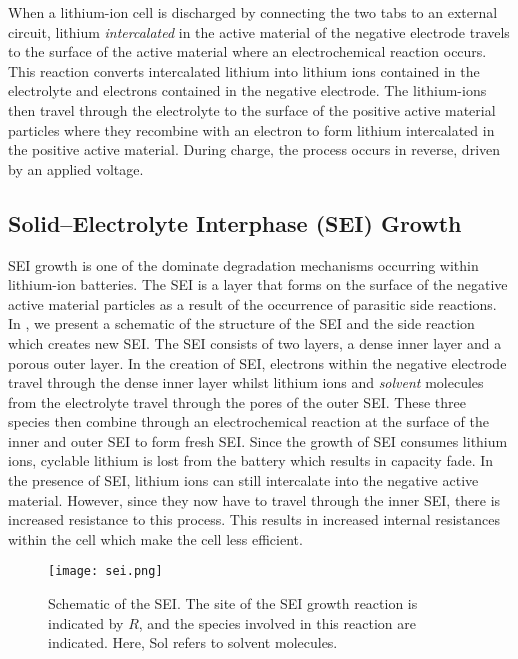 \documentclass[english,a4paper,oneside,9pt]{extarticle}
\begin{document}
When a lithium-ion cell is discharged by connecting the two tabs to an external circuit, lithium \emph{intercalated} in the active material of the negative electrode travels to the surface of the active material where an electrochemical reaction occurs. This reaction converts intercalated lithium into lithium ions contained in the electrolyte and electrons contained in the negative electrode. The lithium-ions then travel through the electrolyte to the surface of the positive active material particles where they recombine with an electron to form lithium intercalated in the positive active material. During charge, the process occurs in reverse, driven by an applied voltage.

\subsection{Solid--Electrolyte Interphase (SEI) Growth}
SEI growth is one of the dominate degradation mechanisms occurring within lithium-ion batteries. The SEI is a layer that forms on the surface of the negative active material particles as a result of the occurrence of parasitic side reactions. In , we present a schematic of the structure of the SEI and the side reaction which creates new SEI. The SEI consists of two layers, a dense inner layer and a porous outer layer. In the creation of SEI, electrons within the negative electrode travel through the dense inner layer whilst lithium ions and \emph{solvent} molecules from the electrolyte travel through the pores of the outer SEI. These three species then combine through an electrochemical reaction at the surface of the inner and outer SEI to form fresh SEI. Since the growth of SEI consumes lithium ions, cyclable lithium is lost from the battery which results in capacity fade. In the presence of SEI, lithium ions can still intercalate into the negative active material. However, since they now have to travel through the inner SEI, there is increased resistance to this process. This results in increased internal resistances within the cell which make the cell less efficient.

\begin{figure}[htbp]
	\centering
	\texttt{[image: sei.png]}
	\caption{Schematic of the SEI. The site of the SEI growth reaction is indicated by $R$, and the species involved in this reaction are indicated. Here, Sol refers to solvent molecules.}
	\label{fig:sei}
\end{figure}
\end{document}
